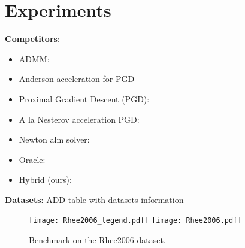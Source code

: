 \section{Experiments}\label{sec:experiments}

\textbf{Competitors}:
\begin{itemize}[noitemsep]
    \item ADMM:
    \item Anderson acceleration for PGD
    \item Proximal Gradient Descent (PGD):
    \item A la Nesterov acceleration PGD:
    \item Newton alm solver: \cite{Ziyan2019}
    \item Oracle:
    \item Hybrid (ours):
\end{itemize}

\textbf{Datasets}:
ADD table with datasets information

\begin{figure}[htbp]
    \centering
    \texttt{[image: Rhee2006\_legend.pdf]}
    \texttt{[image: Rhee2006.pdf]}
    \caption{Benchmark on the Rhee2006 dataset.}
    \label{fig:Rhee2006}
  \end{figure}